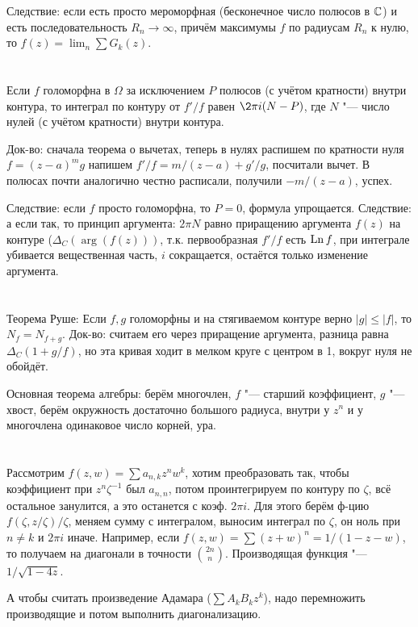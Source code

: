 	Следствие: если есть просто мероморфная (бесконечное число полюсов в $\mathbb{C}$) и есть последовательность $R_n \to \infty$,
	причём максимумы $f$ по радиусам $R_n$ к нулю, то $f(z)=\lim_n \sum G_k(z)$.
	\TODO

\section{} %
	\TODO

\section{} %
	Если $f$ голоморфна в $\Omega$ за исключением $P$ полюсов (с учётом кратности) внутри контура,
	то интеграл по контуру от $f'/f$ равен $\2 \pi i (N-P)$,
	где $N$ "--- число нулей (с учётом кратности) внутри контура.

	Док-во: сначала теорема о вычетах, теперь в нулях распишем по кратности нуля $f=(z-a)^mg$
	напишем $f'/f=m/(z-a)+g'/g$, посчитали вычет.
	В полюсах почти аналогично честно расписали, получили $-m/(z-a)$, успех.

	Следствие: если $f$ просто голоморфна, то $P=0$, формула упрощается.
	Следствие: а если так, то принцип аргумента: $2\pi N$ равно приращению аргумента $f(z)$ на контуре
	($\Delta_C(\arg(f(z)))$, т.к. первообразная $f'/f$ есть $\operatorname{Ln} f$, при интеграле убивается
	вещественная часть, $i$ сокращается, остаётся только изменение аргумента.

\section{} %
	Теорема Руше: Если $f, g$ голоморфны и на стягиваемом контуре верно $|g|\le |f|$, то $N_f = N_{f+g}$.
	Док-во: считаем его через приращение аргумента, разница равна $\Delta_C(1+g/f)$, но эта кривая
	ходит в мелком круге с центром в 1, вокруг нуля не обойдёт.

	Основная теорема алгебры: берём многочлен, $f$ "--- старший коэффициент, $g$ "--- хвост,
	берём окружность достаточно большого радиуса, внутри у $z^n$ и у многочлена одинаковое число корней,
	ура.

\section{} %
	Рассмотрим $f(z, w)=\sum a_{n,k}z^nw^k$, хотим преобразовать так, чтобы
	коэффициент при $z^n\zeta^{-1}$ был $a_{n,n}$, потом проинтегрируем по контуру по $\zeta$,
	всё остальное занулится, а это останется с коэф. $2\pi i$.
	Для этого берём ф-цию $f(\zeta, z/\zeta)/\zeta$, меняем сумму с интегралом,
	выносим интеграл по $\zeta$, он ноль при $n \neq k$ и $2\pi i$ иначе.
	Например, если $f(z,w)=\sum (z+w)^n=1/(1-z-w)$, то получаем на диагонали в точности $\binom{2n}{n}$.
	Производящая функция "--- $1/\sqrt{1-4z}$.

	А чтобы считать произведение Адамара ($\sum A_kB_kz^k$), надо перемножить производящие
	и потом выполнить диагонализацию.

\section{} %
	\TODO

\section{} %
	\TODO
